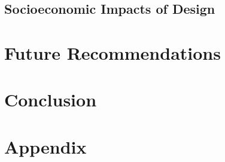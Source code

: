 \documentclass[12pt, onecolumn]{article}
\begin{document}
\subsection{Socioeconomic Impacts of Design}

\section{Future Recommendations}


\section{Conclusion}

\printbibliography
\newpage
\section*{Appendix}
\end{document}
